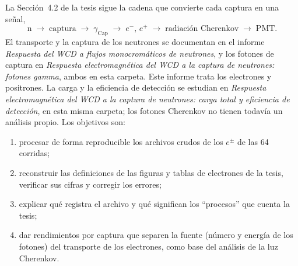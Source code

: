 \documentclass[11pt,a4paper]{article}
\begin{document}
La Sección~4.2 de la tesis sigue la cadena que convierte cada captura en una señal,
\[
\mathrm{n}\;\longrightarrow\;\text{captura}\;\longrightarrow\;\gamma_\mathrm{Cap}\;\longrightarrow\;e^-,\,e^+\;\longrightarrow\;\text{radiación Cherenkov}\;\longrightarrow\;\mathrm{PMT}.
\]
El transporte y la captura de los neutrones se documentan en el informe \emph{Respuesta del WCD a flujos monocromáticos de neutrones}, y los fotones de captura en \emph{Respuesta electromagnética del WCD a la captura de neutrones: fotones gamma}, ambos en esta carpeta. Este informe trata los electrones y positrones. La carga y la eficiencia de detección se estudian en \emph{Respuesta electromagnética del WCD a la captura de neutrones: carga total y eficiencia de detección}, en esta misma carpeta; los fotones Cherenkov no tienen todavía un análisis propio. Los objetivos son:
\begin{enumerate}
  \item procesar de forma reproducible los archivos crudos de los $e^\pm$ de las 64 corridas;
  \item reconstruir las definiciones de las figuras y tablas de electrones de la tesis, verificar sus cifras y corregir los errores;
  \item explicar qué registra el archivo y qué significan los ``procesos'' que cuenta la tesis;
  \item dar rendimientos por captura que separen la fuente (número y energía de los fotones) del transporte de los electrones, como base del análisis de la luz Cherenkov.
\end{enumerate}
\end{document}
